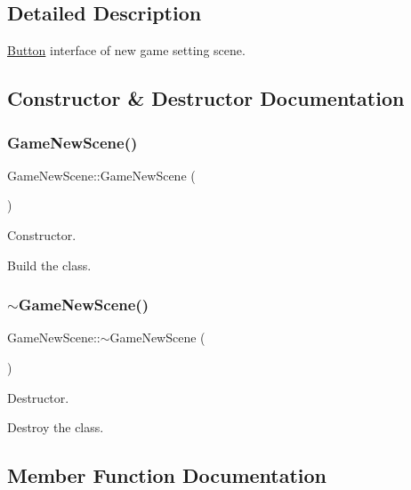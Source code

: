 \subsection{Detailed Description}
\hyperlink{classButton}{Button} interface of new game setting scene. 

\subsection{Constructor \& Destructor Documentation}
\mbox{\label{classGameNewScene_af482b13a2d9e315ef39a6e41293bf4fb}} 
\subsubsection{\texorpdfstring{Game\+New\+Scene()}{GameNewScene()}}
{\footnotesize\ttfamily Game\+New\+Scene\+::\+Game\+New\+Scene (\begin{DoxyParamCaption}{ }\end{DoxyParamCaption})}



Constructor. 

Build the class. \mbox{\label{classGameNewScene_a3df0ff81012d3f7dbd08c7367be22fdf}} 
\subsubsection{\texorpdfstring{$\sim$\+Game\+New\+Scene()}{~GameNewScene()}}
{\footnotesize\ttfamily Game\+New\+Scene\+::$\sim$\+Game\+New\+Scene (\begin{DoxyParamCaption}{ }\end{DoxyParamCaption})}



Destructor. 

Destroy the class. 

\subsection{Member Function Documentation}
\mbox{\label{classGameNewScene_a21c27ef3ea1923d975683e1bcdd134fa}} 
